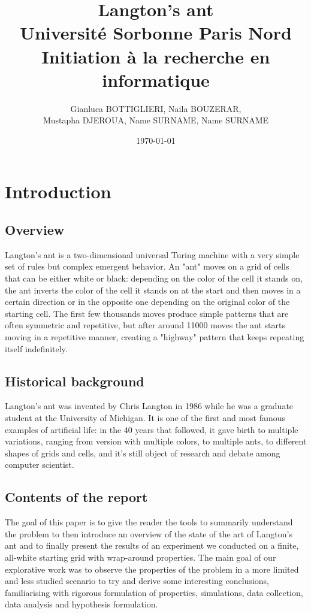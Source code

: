\documentclass{article}
\title{Langton's ant \\  \LARGE Université Sorbonne Paris Nord \\ \large Initiation à la recherche en informatique}
\author{Gianluca BOTTIGLIERI, Naila BOUZERAR, \\ Mustapha DJEROUA, Name SURNAME, Name SURNAME}
\date{\today}
\begin{document}
\maketitle

\newpage

\tableofcontents

\newpage

\tableofcontents

\section{Introduction}
\subsection{Overview}
Langton's ant is a two-dimensional universal Turing machine with a very simple set of rules but complex emergent behavior. 
An "ant" moves on a grid of cells that can be either white or black: depending on the color of the cell it stands on, the ant 
inverts the color of the cell it stands on at the start and then moves in a certain direction or in the opposite one depending
on the original color of the starting cell. 
The first few thousands moves produce simple patterns that are often symmetric and repetitive, but after around 11000 moves 
the ant starts moving in a repetitive manner, creating a "highway" pattern that keeps repeating itself indefinitely.

\subsection{Historical background}
Langton's ant was invented by Chris Langton in 1986 while he was a graduate student at the University of Michigan.
It is one of the first and most famous examples of artificial life: in the 40 years that followed, it gave birth to multiple 
variations, ranging from version with multiple colors, to multiple ants, to different shapes of grids and cells, and it's still object 
of research and debate among computer scientist.

\subsection{Contents of the report}
The goal of this paper is to give the reader the tools to summarily understand the problem to then introduce an overview of the state of the art 
of Langton's ant and to finally present the results of an experiment we conducted on a finite, all-white starting grid with wrap-around properties.
The main goal of our explorative work was to observe the properties of the problem in a more limited and less studied scenario to try and derive some interesting
conclusions, familiarising with rigorous formulation of properties, simulations, data collection, data analysis and hypothesis formulation.
\end{document}
